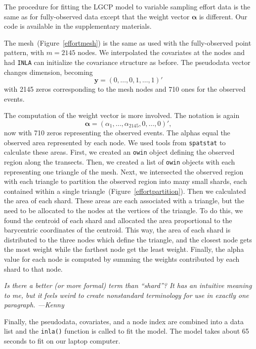 \documentclass[]{interact}
\begin{document}
The procedure for fitting the LGCP model to variable sampling effort data is
the same as for fully-observed data except that the weight vector
\(\boldsymbol{\alpha}\) is different. Our code is available in the
supplementary materials.

The mesh~(Figure~\ref{effortmesh}) is the same as used with the fully-observed
point pattern, with \(m = 2145\) nodes. We interpolated the covariates
at the nodes and had \texttt{INLA} can initialize the covariance structure as
before. The pseudodata vector changes dimension, becoming
\begin{displaymath}
\mathbf{y} = (0, \dots, 0, 1, \dots, 1)'
\end{displaymath}
with 2145 zeros corresponding to the mesh nodes and 710 ones for the observed
events.

The computation of the weight vector is more involved. The notation is again
\begin{displaymath}
\boldsymbol{\alpha} = (\alpha_{1}, \dots, \alpha_{2145}, 0, \dots, 0)',
\end{displaymath}
now with 710 zeros representing the observed events. The alphas equal the
observed area represented by each node. We used tools from \texttt{spatstat}
to calculate these areas. First, we created an \texttt{owin} object defining
the observed region along the transects. Then, we created a list of
\texttt{owin} objects with each representing one triangle of the mesh. Next,
we intersected the observed region with each triangle to partition the observed
region into many small shards, each contained within a single
triangle~(Figure~\ref{effortpartition}). Then we calculated the area of each
shard. These areas are each associated with a triangle, but the need to be
allocated to the nodes at the vertices of the triangle. To do this, we found
the centroid of each shard and allocated the area proportional to the
barycentric coordinates of the centroid. This way, the area of each shard is
distributed to the three nodes which define the triangle, and the closest node
gets the most weight while the farthest node get the least weight. Finally,
the alpha value for each node is computed by summing the weights contributed
by each shard to that node.

{\it Is there a better (or more formal) term than ``shard''? It has an
intuitive meaning to me, but it feels weird to create nonstandard terminology
for use in exactly one paragraph. ---Kenny}

Finally, the pseudodata, covariates, and a node index are combined into a data
list and the \texttt{inla()} function is called to fit the model. The model
takes about 65 seconds to fit on our laptop computer.
\end{document}
